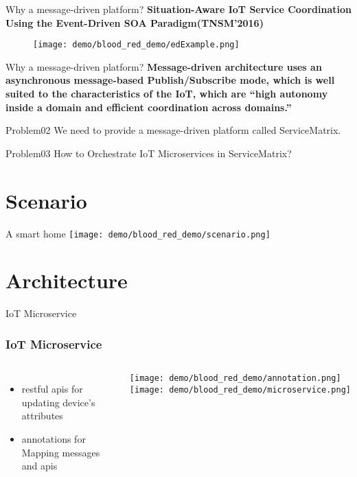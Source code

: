 \documentclass[notheorems, aspectratio=54]{beamer}
\begin{document}
\begin{frame}{Why a message-driven platform?}
    \textbf{Situation-Aware IoT Service Coordination Using the
Event-Driven SOA Paradigm(TNSM'2016)}
    \begin{figure}[t]                               
    \texttt{[image: demo/blood\_red\_demo/edExample.png]}
    \centering
    \end{figure}
\end{frame}

\begin{frame}{Why a message-driven platform?}
    \textbf{Message-driven architecture uses an asynchronous message-based Publish/Subscribe mode, which is well suited to the characteristics of the IoT, which are “high autonomy inside a domain and efficient coordination across domains.” }
     \begin{block}{Problem02}
    We need to provide a message-driven platform called ServiceMatrix.
    \end{block}
    
  \begin{block}{Problem03}
    How to Orchestrate IoT Microservices in ServiceMatrix?
    \end{block}
\end{frame}

\section{Scenario}
\begin{frame}{A smart home}
     \texttt{[image: demo/blood\_red\_demo/scenario.png]}
\end{frame}
\section{Architecture}
\begin{frame}{IoT Microservice}
    \frametitle{IoT Microservice}
    \begin{columns}
    \begin{itemize}
    \item restful apis for updating device's attributes
    \item annotations for Mapping messages and apis
    \end{itemize}
    \texttt{[image: demo/blood\_red\_demo/annotation.png]}
      \texttt{[image: demo/blood\_red\_demo/microservice.png]}
    \end{columns}
\end{frame}
\end{document}
